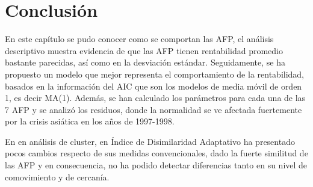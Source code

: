 \section{Conclusi\'on}
En este cap\'itulo se pudo conocer como se comportan las AFP, el an\'alisis descriptivo muestra evidencia de que las AFP tienen rentabilidad promedio bastante parecidas, as\'i como en la desviaci\'on est\'andar. Seguidamente, se ha propuesto un modelo que mejor representa el comportamiento de la rentabilidad, basados en la informaci\'on del AIC que son los modelos de media m\'ovil de orden 1, es decir MA(1). Adem\'as, se han calculado los par\'ametros para cada una de las 7 AFP y se analiz\'o los residuos, donde la normalidad se ve afectada fuertemente por la crisis asi\'atica en los a\~nos de 1997-1998.

En en an\'alisis de cluster, en \'Indice de Disimilaridad Adaptativo ha presentado pocos cambios respecto de sus medidas convencionales, dado la fuerte similitud de las AFP y en consecuencia, no ha podido detectar diferencias tanto en su nivel de comovimiento y de cercan\'ia.


